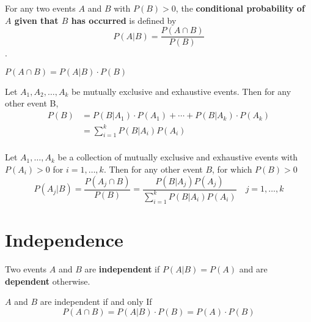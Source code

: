 \begin{definition}
	For any two events $A$ and $B$ with $P(B) > 0$, the \textbf{conditional probability of $A$ given that $B$ has occurred} is defined by
	$$ P(A | B)  = \frac{P(A \cap B)}{P(B)}$$.
\end{definition}

\begin{theorem}
	$P(A \cap B) = P(A | B) \cdot P(B)$
\end{theorem}

\begin{theorem}
	Let $A_1, A_2, \dots, A_k$ be mutually exclusive and exhaustive events. Then for any other event B,
	\begin{align*}
		P(B) &= P(B|A_1)\cdot P(A_1) + \cdots + P(B|A_k)\cdot P(A_k)\\
		&=\sum\limits_{i = 1} ^ k P(B|A_i)P(A_i)\\
	\end{align*}
\end{theorem}

\begin{theorem}
	Let $A_1, \dots, A_k$ be a collection of mutually exclusive and exhaustive events with $ P(A_i) > 0$ for $i = 1,\dots,k$. Then for any other event $B$, for which $P(B) > 0$
	$$ P(A_j|B) = \frac{P(A_j\cap B)}{P(B)} = \frac{P(B|A_j)P(A_j)}{\sum\limits_{i = 1}^kP(B|A_i)P(A_i)}\quad j = 1,\dots,k$$
\end{theorem}

\section{Independence}

\begin{definition}
	Two events $A$ and $B$ are \textbf{independent} if $P(A|B) = P(A)$ and are \textbf{dependent} otherwise.
\end{definition}

\begin{proposition}
	$A$ and $B$ are independent if and only If
	$$ P(A\cap B) = P(A|B) \cdot P(B) = P(A) \cdot P(B)$$
\end{proposition}